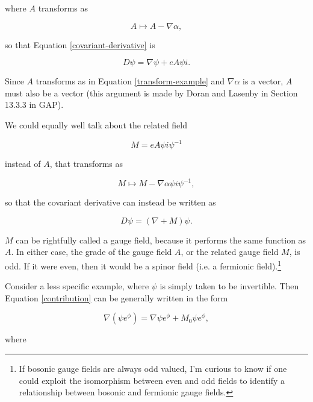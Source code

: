 \documentclass{article}
\begin{document}
where $A$ transforms as 

\begin{equation}
  A \mapsto A - \nabla \alpha, \label{transform-example}
\end{equation}

so that Equation \ref{covariant-derivative} is

\begin{equation}
  D \psi = \nabla \psi + e A \psi i.\label{covariant-derivative-example}
\end{equation}

Since $A$ transforms as in Equation \ref{transform-example} and $\nabla \alpha$ is a vector, $A$ must also be a vector (this argument is made by Doran and Lasenby in Section 13.3.3 in GAP).

We could equally well talk about the related field

\begin{equation}
  M = e A \psi i \psi^{-1} \label{M-field-example}
\end{equation} 

instead of $A$, that transforms as

\begin{equation}
  M \mapsto M - \nabla \alpha \psi i \psi^{-1},
\end{equation}

so that the covariant derivative can instead be written as 

\begin{equation}
  D \psi = (\nabla + M) \psi.
\end{equation}

$M$ can be rightfully called a gauge field, because it performs the same function as $A$. In either case, the grade of the gauge field $A$, or the related gauge field $M$, is odd. If it were even, then it would be a spinor field (i.e. a fermionic field).\footnote{If bosonic gauge fields are always odd valued, I'm curious to know if one could exploit the isomorphism between even and odd fields to identify a relationship between bosonic and fermionic gauge fields.}

Consider a less specific example, where $\psi$ is simply taken to be invertible. Then Equation \ref{contribution} can be generally written in the form

\begin{equation}
  \nabla (\psi e^\phi) = \nabla \psi e^\phi + M_0 \psi e^\phi,
\end{equation}

where
\end{document}
